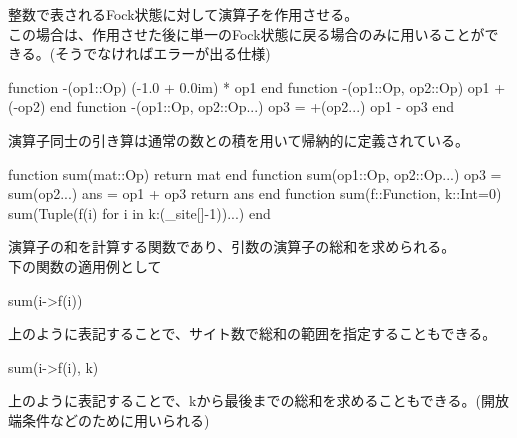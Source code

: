 \documentclass{ltjsarticle}
\begin{document}
整数で表されるFock状態に対して演算子を作用させる。\\
この場合は、作用させた後に単一のFock状態に戻る場合のみに用いることができる。(そうでなければエラーが出る仕様)
\begin{jllisting}
function -(op1::Op)
  (-1.0 + 0.0im) * op1
end
function -(op1::Op, op2::Op)
  op1 + (-op2)
end
function -(op1::Op, op2::Op...)
  op3 = +(op2...)
  op1 - op3
end
\end{jllisting}
演算子同士の引き算は通常の数との積を用いて帰納的に定義されている。
\begin{jllisting}
function sum(mat::Op)
  return mat
end
function sum(op1::Op, op2::Op...)
  op3 = sum(op2...)
  ans = op1 + op3
  return ans
end
function sum(f::Function, k::Int=0)
  sum(Tuple(f(i) for i in k:(_site[]-1))...)
end
\end{jllisting}
演算子の和を計算する関数であり、引数の演算子の総和を求められる。\\
下の関数の適用例として
\begin{jllisting}
sum(i->f(i))
\end{jllisting}
上のように表記することで、サイト数で総和の範囲を指定することもできる。\\
\begin{jllisting}
sum(i->f(i), k)
\end{jllisting}
上のように表記することで、kから最後までの総和を求めることもできる。(開放端条件などのために用いられる)\\
\end{document}

